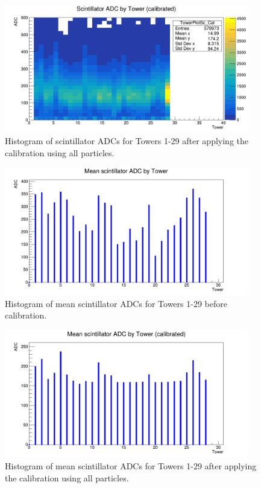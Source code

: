 \begin{figure}[hp]
	\centering
	\includegraphics[width=0.95\textwidth]{../Pictures/IDEA/Calibration/towerplot-scintillator-calibrated-all.png}
	\caption{Histogram of scintillator \acrshort{ADC}s for Towers 1-29 after applying the calibration using all particles.}
	\label{figure:testbeam/results/towerplot-raw-calibrated}
\end{figure}

\begin{figure}[hp]
	\centering
	\includegraphics[width=0.95\textwidth]{../Pictures/IDEA/Calibration/towerplot-scintillator-mean-uncalibrated.png}
	\caption{Histogram of mean scintillator \acrshort{ADC}s for Towers 1-29 before calibration.}
	\label{figure:testbeam/results/towerplot-mean-uncalibrated-all}
\end{figure}

\begin{figure}[hp]
	\centering
	\includegraphics[width=0.95\textwidth]{../Pictures/IDEA/Calibration/towerplot-scintillator-mean-calibrated-all.png}
	\caption{Histogram of mean scintillator \acrshort{ADC}s for Towers 1-29 after applying the calibration using all particles.}
	\label{figure:testbeam/results/towerplot-mean-calibrated-all}
\end{figure}

